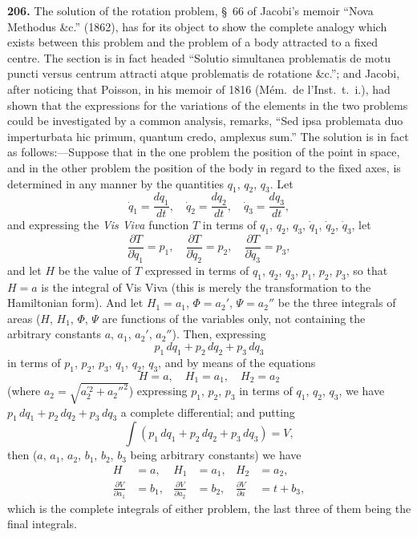 \documentclass[12pt,a4paper]{article}
\theoremstyle{definition}
\begin{document}
\noindent\textbf{206.} The solution of the rotation problem, \S~66 of Jacobi's memoir ``Nova Methodus \&c.'' (1862), has for its object to show the complete analogy which exists between this problem and the problem of a body attracted to a fixed centre. The section is in fact headed ``Solutio simultanea problematis de motu puncti versus centrum attracti atque problematis de rotatione \&c.''; and Jacobi, after noticing that Poisson, in his memoir of 1816 (M\'{e}m.~de l'Inst.~t.~i.), had shown that the expressions for the variations of the elements in the two problems could be investigated by a common analysis, remarks, ``Sed ipsa problemata duo imperturbata hic primum, quantum credo, amplexus sum.'' The solution is in fact as follows:---Suppose that in the one problem the position of the point in space, and in the other problem the position of the body in regard to the fixed axes, is determined in any manner by the quantities $q_1$, $q_2$, $q_3$. Let
\[
\dot{q}_1 = \frac{dq_1}{dt},\quad \dot{q}_2 = \frac{dq_2}{dt},\quad \dot{q}_3 = \frac{dq_3}{dt},
\]
and expressing the \textit{Vis Viva} function $T$ in terms of $q_1$, $q_2$, $q_3$, $\dot{q}_1$, $\dot{q}_2$, $\dot{q}_3$, let
\[
\frac{\partial T}{\partial \dot{q}_1} = p_1,\quad \frac{\partial T}{\partial \dot{q}_2} = p_2,\quad \frac{\partial T}{\partial \dot{q}_3} = p_3,
\]
and let $H$ be the value of $T$ expressed in terms of $q_1$, $q_2$, $q_3$, $p_1$, $p_2$, $p_3$, so that $H = a$ is the integral of Vis Viva (this is merely the transformation to the Hamiltonian form). And let $H_1 = a_1$, $\Phi = a_2'$, $\Psi = a_2''$ be the three integrals of areas ($H$, $H_1$, $\Phi$, $\Psi$ are functions of the variables only, not containing the arbitrary constants $a$, $a_1$, $a_2'$, $a_2''$). Then, expressing
\[
p_1\,dq_1 + p_2\,dq_2 + p_3\,dq_3
\]
in terms of $p_1$, $p_2$, $p_3$, $q_1$, $q_2$, $q_3$, and by means of the equations
\[
H = a,\quad H_1 = a_1,\quad H_2 = a_2
\]
(where $a_2 = \sqrt{a_2^{'2} + a_2''^{2}}$) expressing $p_1$, $p_2$, $p_3$ in terms of $q_1$, $q_2$, $q_3$, we have $p_1\,dq_1 + p_2\,dq_2 + p_3\,dq_3$ a complete differential; and putting
\[
\int (p_1\,dq_1 + p_2\,dq_2 + p_3\,dq_3) = V,
\]
then ($a$, $a_1$, $a_2$, $b_1$, $b_2$, $b_3$ being arbitrary constants) we have
\begin{align*}
H &= a, & H_1 &= a_1, & H_2 &= a_2,\\
\frac{\partial V}{\partial a_1} &= b_1, & \frac{\partial V}{\partial a_2} &= b_2, & \frac{\partial V}{\partial a} &= t + b_3,
\end{align*}
which is the complete integrals of either problem, the last three of them being the final integrals.
\end{document}
